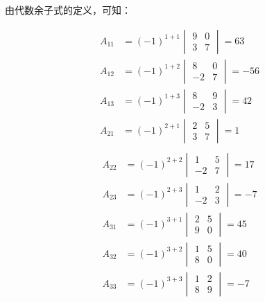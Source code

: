 \begin{solution}
由代数余子式的定义，可知：    
\begin{multicols}{2}
 \[\begin{split}
     A_{11}&=(-1)^{1+1}\begin{vmatrix}
    9&0\\3&7
\end{vmatrix} =63 \\
A_{12}&=(-1)^{1+2}\begin{vmatrix}
    8&0\\-2&7
\end{vmatrix} =-56 \\A_{13}&=(-1)^{1+3}\begin{vmatrix}
    8&9\\-2&3
\end{vmatrix} =42 \\A_{21}&=(-1)^{2+1}\begin{vmatrix}
    2&5\\3&7
\end{vmatrix} =1\\  
 \end{split}   \]
\[\begin{split}
    A_{22}&=(-1)^{2+2}\begin{vmatrix}
        1&5\\-2&7
    \end{vmatrix} =17 \\
    A_{23}&=(-1)^{2+3}\begin{vmatrix}
    1&2\\-2&3
\end{vmatrix} =-7 \\A_{31}&=(-1)^{3+1}\begin{vmatrix}
    2&5\\9&0
\end{vmatrix} =45 \\A_{32}&=(-1)^{3+2}\begin{vmatrix}
    1&5\\8&0
\end{vmatrix} =40  \\A_{33}&=(-1)^{3+3}\begin{vmatrix}
    1&2\\8&9
\end{vmatrix} =-7  
\end{split}\]
\end{multicols}

\end{solution}

